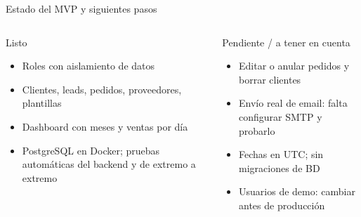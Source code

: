\documentclass[aspectratio=169,11pt]{beamer}
\begin{document}
\begin{frame}{Estado del MVP y siguientes pasos}
  \begin{columns}[T]
    \begin{block}{Listo}
      \begin{itemize}\small
        \item Roles con aislamiento de datos
        \item Clientes, leads, pedidos, proveedores, plantillas
        \item Dashboard con meses y ventas por d\'ia
        \item PostgreSQL en Docker; pruebas autom\'aticas del backend y de extremo a extremo
      \end{itemize}
    \end{block}
    \begin{alertblock}{Pendiente / a tener en cuenta}
      \begin{itemize}\small
        \item Editar o anular pedidos y borrar clientes
        \item Env\'io real de email: falta configurar SMTP y probarlo
        \item Fechas en UTC; sin migraciones de BD
        \item Usuarios de demo: cambiar antes de producci\'on
      \end{itemize}
    \end{alertblock}
  \end{columns}
\end{frame}
\end{document}
